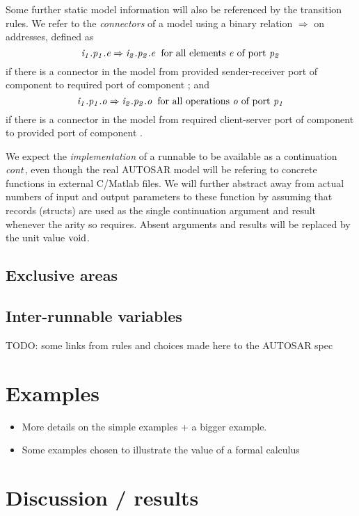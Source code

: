 \documentclass[twocolumn]{article}
\begin{document}
Some further static model information will also be referenced by the transition rules. We refer to the \emph{connectors} of a model using a binary relation $\Rightarrow$ on addresses, defined as
\[
  \Tconnect{\Tep{\V{E}}{\V{P_1}}{\V{I_1}}}{\Tep{\V{E}}{\V{P_2}}{\V{I_2}}} \;\;\text{for all elements \V{E} of port \V{P_2}}
\]
if there is a connector in the model from provided sender-receiver port  of component  to required port  of component ; and
\[
  \Tconnect{\Top{\V{O}}{\V{P_1}}{\V{I_1}}}{\Top{\V{O}}{\V{P_2}}{\V{I_2}}} \;\;\text{for all operations \V{O} of port \V{P_1}}
\]
if there is a connector in the model from required client-server port  of component  to provided port  of component .

We expect the \emph{implementation} of a runnable to be available as a continuation $\Cont$, even though the real AUTOSAR model will be refering to concrete functions in external C/Matlab files. We will further abstract away from actual numbers of input and output parameters to these function by assuming that records (structs) are used as the single continuation argument and result whenever the arity so requires. Absent arguments and results will be replaced by the unit value $\text{void}$.

\subsection{Exclusive areas}


\subsection{Inter-runnable variables}



TODO: some links from rules and choices made here to the AUTOSAR spec

\section{Examples}
\label{sec:Examples}

\begin{itemize}
\item More details on the simple examples + a bigger example.
\item Some examples chosen to illustrate the value of a formal calculus
\end{itemize}

\section{Discussion / results}
\label{sec:Disc}
\end{document}
